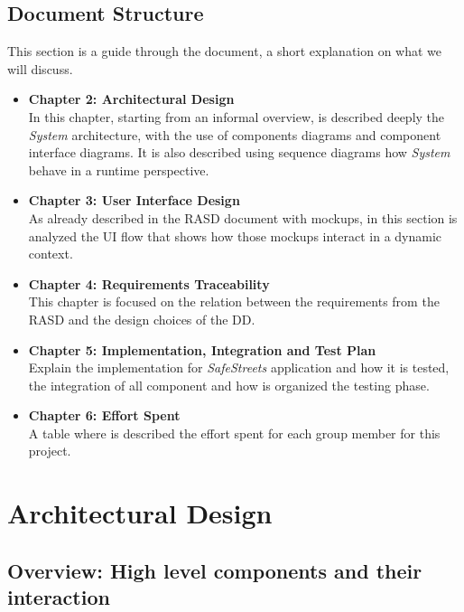 \documentclass{article}
\begin{document}
\subsection{Document Structure}
This section is a guide through the document, a short explanation on what we will discuss.
\begin{itemize}
    \item \textbf{Chapter 2: Architectural Design}\\
    In this chapter, starting from an informal overview, is described deeply the \textit{System}
    architecture, with the use of components diagrams and component interface diagrams. It is also
    described using sequence diagrams how \textit{System} behave in a runtime perspective.

    \item \textbf{Chapter 3: User Interface Design}\\
    As already described in the RASD document with mockups, in this section is analyzed the 
    UI flow that shows how those mockups interact in a dynamic context.

    \item \textbf{Chapter 4: Requirements Traceability}\\
    This chapter is focused on the relation between the requirements from the RASD and
    the design choices of the DD.

    \item \textbf{Chapter 5: Implementation, Integration and Test Plan}\\
    Explain the implementation for \textit{SafeStreets} application and how it is 
    tested, the integration of all component and how is organized the testing phase.

    \item \textbf{Chapter 6: Effort Spent}\\
    A table where is described the effort spent for each group member for this project.

\end{itemize}


\clearpage

\section{Architectural Design}

\subsection{Overview: High level components and their interaction}
\end{document}
